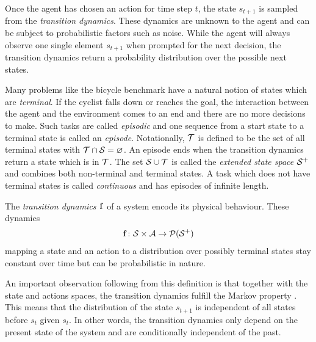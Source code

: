 Once the agent has chosen an action for time step $t$, the state $s_{t+1}$ is sampled from the \emph{transition dynamics}.
These dynamics are unknown to the agent and can be subject to probabilistic factors such as noise.
While the agent will always observe one single element $s_{t+1}$ when prompted for the next decision, the transition dynamics return a probability distribution over the possible next states.

Many problems like the bicycle benchmark have a natural notion of states which are \emph{terminal}.
If the cyclist falls down or reaches the goal, the interaction between the agent and the environment comes to an end and there are no more decisions to make.
Such tasks are called \emph{episodic} and one sequence from a start state to a terminal state is called an \emph{episode}.
Notationally, $\mathcal{T}$ is defined to be the set of all terminal states with $\mathcal{T} \cap \mathcal{S} = \varnothing$.
An episode ends when the transition dynamics return a state which is in $\mathcal{T}$.
The set $\mathcal{S} \cup \mathcal{T}$ is called the \emph{extended state space $\mathcal{S}^+$} and combines both non-terminal and terminal states.
A task which does not have terminal states is called \emph{continuous} and has episodes of infinite length.

\begin{definition}
    \label{def:transition_dynamics}
    The \emph{transition dynamics $\operatorname{\mathbf{f}}$} of a system encode its physical behaviour.
    These dynamics
    \begin{align}
        \operatorname{\mathbf{f}} \colon \mathcal{S} \times \mathcal{A} \to \operatorname{\mathcal{P}}(\mathcal{S}^+)
    \end{align}
    mapping a state and an action to a distribution over possibly terminal states stay constant over time but can be probabilistic in nature.
\end{definition}
An important observation following from this definition is that together with the state and actions spaces, the transition dynamics fulfill the Markov property \cite{sutton_reinforcement_1998}.
This means that the distribution of the state $s_{t+1}$ is independent of all states before $s_t$ given $s_t$.
In other words, the transition dynamics only depend on the present state of the system and are conditionally independent of the past.

